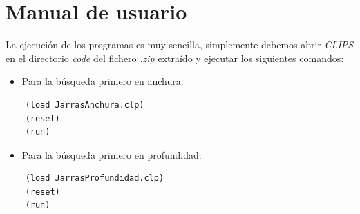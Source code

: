 \documentclass[11pt,a4paper,final]{article}
\begin{document}
\newpage

\section{Manual de usuario}
La ejecución de los programas es muy sencilla, simplemente debemos abrir \emph{CLIPS} en el directorio \emph{code} del fichero \emph{.zip} extraído y ejecutar los siguientes comandos:

\begin{itemize}
	\item Para la búsqueda primero en anchura:
\end{itemize}

\begin{lstlisting}
	(load JarrasAnchura.clp)
	(reset)
	(run)
\end{lstlisting}

\begin{itemize}
	\item Para la búsqueda primero en profundidad:
\end{itemize}

\begin{lstlisting}
	(load JarrasProfundidad.clp)
	(reset)
	(run)
\end{lstlisting}

\begin{figure}[ht]
	\centering
	\qquad
\end{figure}
\end{document}
